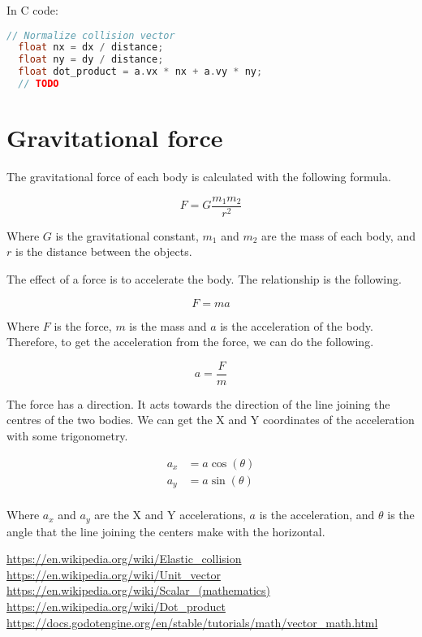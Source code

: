 \documentclass{amsart}
\begin{document}

In C code:

\begin{lstlisting}[language=C]
  // Normalize collision vector
  float nx = dx / distance;
  float ny = dy / distance;
  float dot_product = a.vx * nx + a.vy * ny;
  // TODO
\end{lstlisting}

\newpage

\section{Gravitational force}

The gravitational force of each body is calculated with the following formula.

\begin{displaymath}
  F = G \frac{m_1m_2}{r^2}
\end{displaymath}

Where \(G\) is the gravitational constant, \(m_1\) and \(m_2\) are the mass of
each body, and \(r\) is the distance between the objects.

The effect of a force is to accelerate the body. The relationship is the
following.

\begin{displaymath}
  F = m a
\end{displaymath}

Where \(F\) is the force, \(m\) is the mass and \(a\) is the acceleration of
the body. Therefore, to get the acceleration from the force, we can do the
following.

\begin{displaymath}
  a = \frac{F}{m}
\end{displaymath}

The force has a direction. It acts towards the direction of the line joining
the centres of the two bodies. We can get the X and Y coordinates of the
acceleration with some trigonometry.

\begin{align*}
  a_x &= a \cos(\theta) \\
  a_y &= a \sin(\theta) \\
\end{align*}

Where \(a_x\) and \(a_y\) are the X and Y accelerations, \(a\) is the
acceleration, and \(\theta\) is the angle that the line joining the centers make
with the horizontal.

\newpage

\begin{thebibliography}{9}
  \url{https://en.wikipedia.org/wiki/Elastic_collision}
  \url{https://en.wikipedia.org/wiki/Unit_vector}
  \url{https://en.wikipedia.org/wiki/Scalar_(mathematics)}
  \url{https://en.wikipedia.org/wiki/Dot_product}
  \url{https://docs.godotengine.org/en/stable/tutorials/math/vector_math.html}
\end{thebibliography}
\end{document}
